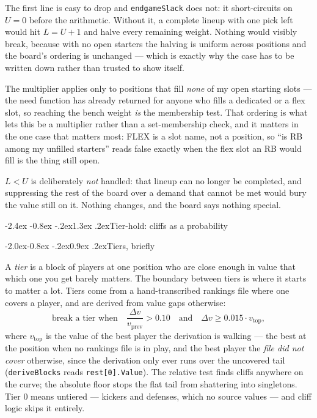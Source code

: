 \documentclass[10pt,a4paper]{article}
\makeatletter
\theoremstyle{plain}
\theoremstyle{definition}
\theoremstyle{remark}
\newcommand{\code}[1]{\texttt{\small #1}}
\renewcommand\section{\@startsection{section}{1}{\z@}%
  {-2.4ex \@plus -0.8ex \@minus -.2ex}{1.3ex \@plus.2ex}{\normalfont\Large\bfseries}}
\renewcommand\subsection{\@startsection{subsection}{2}{\z@}%
  {-2.0ex\@plus -0.8ex \@minus -.2ex}{0.9ex \@plus .2ex}{\normalfont\large\bfseries}}
\makeatother
\begin{document}
The first line is easy to drop and \code{endgameSlack} does not: it short-circuits on
$U = 0$ before the arithmetic. Without it, a complete lineup with one pick left would hit
$L = U + 1$ and halve every remaining weight. Nothing would visibly break, because with
no open starters the halving is uniform across positions and the board's ordering is
unchanged --- which is exactly why the case has to be written down rather than trusted to
show itself.

The multiplier applies only to positions that fill \emph{none} of my open starting slots
--- the need function has already returned for anyone who fills a dedicated or a flex
slot, so reaching the bench weight \emph{is} the membership test. That ordering is what
lets this be a multiplier rather than a set-membership check, and it matters in the one
case that matters most: FLEX is a slot name, not a position, so ``is RB among my unfilled
starters'' reads false exactly when the flex slot an RB would fill is the thing still
open.

$L < U$ is deliberately \emph{not} handled: that lineup can no longer be completed, and
suppressing the rest of the board over a demand that cannot be met would bury the value
still on it. Nothing changes, and the board says nothing special.

\section{Tier-hold: cliffs as a probability}
\label{sec:tierhold}

\subsection{Tiers, briefly}

A \emph{tier} is a block of players at one position who are close enough in value that
which one you get barely matters. The boundary between tiers is where it starts to
matter a lot. Tiers come from a hand-transcribed rankings file where one covers a player,
and are derived from value gaps otherwise:
\[
\text{break a tier when}\quad \frac{\Delta v}{v_{\text{prev}}} > 0.10
\quad\text{and}\quad \Delta v \ge 0.015 \cdot v_{\text{top}},
\]
where $v_{\text{top}}$ is the value of the best player the derivation is walking --- the
best at the position when no rankings file is in play, and the best player the \emph{file
did not cover} otherwise, since the derivation only ever runs over the uncovered tail
(\code{deriveBlocks} reads \code{rest[0].Value}). The relative test finds cliffs anywhere
on the curve; the absolute floor stops the flat tail from shattering into singletons.
Tier $0$ means untiered --- kickers and defenses, which no source values --- and cliff
logic skips it entirely.
\end{document}
